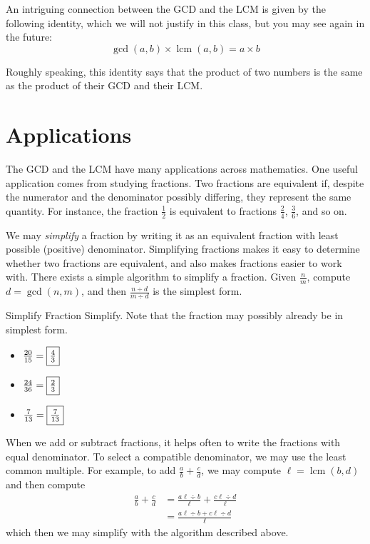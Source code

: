 \documentclass[a4paper,10pt]{report}
\begin{document}
An intriguing connection between the GCD and the LCM is given by the following
identity, which we will not justify in this class, but you may see again in the
future: \[
 \gcd(a, b) \times \operatorname{lcm}(a, b) = a \times b
\]

Roughly speaking, this identity says that the product of two numbers is the same
as the product of their GCD and their LCM.

\section{Applications}
The GCD and the LCM have many applications across mathematics. One useful
application comes from studying fractions. Two fractions are equivalent if,
despite the numerator and the denominator possibly differing, they represent
the same quantity. For instance, the fraction $\frac{1}{2}$ is equivalent to
fractions $\frac{2}{4}$, $\frac{3}{6}$, and so on.

We may \emph{simplify} a fraction by writing it as an equivalent fraction with
least possible (positive) denominator. Simplifying fractions makes it easy to
determine whether two fractions are equivalent, and also makes fractions easier
to work with. There exists a simple algorithm to simplify a fraction. Given
$\frac{n}{m}$, compute $d=\gcd(n, m)$, and then $\frac{n\div d}{m\div d}$ is the
simplest form.

\begin{problem}{Simplify Fraction}
 Simplify. Note that the fraction may possibly already be in simplest form.

 \begin{itemize}
  \item $\frac{20}{15}=\Ans{\frac{4}{3}}$
  \item $\frac{24}{36}=\Ans{\frac{2}{3}}$
  \item $\frac{7}{13}=\Ans{\frac{7}{13}}$
 \end{itemize}
\end{problem}

When we add or subtract fractions, it helps often to write the fractions with
equal denominator. To select a compatible denominator, we may use the least
common multiple. For example, to add $\frac{a}{b}+\frac{c}{d}$, we may compute
$\ell=\operatorname{lcm}(b, d)$ and then compute \begin{align*}
 \frac{a}{b}+\frac{c}{d}
 &= \frac{a\ell\div b}{\ell} + \frac{c\ell\div d}{\ell} \\
 &= \frac{a\ell\div b + c\ell\div d}{\ell}
\end{align*} which then we may simplify with the algorithm described above.
\end{document}
